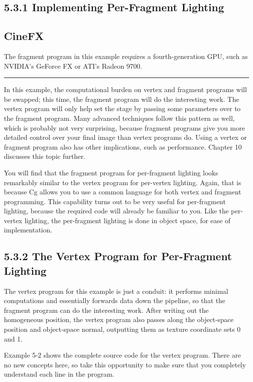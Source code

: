 \documentclass[../main.tex]{subfiles}
\begin{document}
\subsection{5.3.1 Implementing Per-Fragment Lighting}

\subsection*{CineFX}

The fragment program in this example requires a fourth-generation GPU, such as NVIDIA's GeForce FX or ATI's Radeon 9700.
\hrule

In this example, the computational burden on vertex and fragment programs will be swapped; this time, the fragment program will do the interesting work. The vertex program will only help set the stage by passing some parameters over to the fragment program. Many advanced techniques follow this pattern as well, which is probably not very surprising, because fragment programs give you more detailed control over your final image than vertex programs do. Using a vertex or fragment program also has other implications, such as performance. Chapter 10 discusses this topic further.

You will find that the fragment program for per-fragment lighting looks remarkably similar to the vertex program for per-vertex lighting. Again, that is because Cg allows you to use a common language for both vertex and fragment programming. This capability turns out to be very useful for per-fragment lighting, because the required code will already be familiar to you. Like the per-vertex lighting, the per-fragment lighting is done in object space, for ease of implementation.

\subsection{5.3.2 The Vertex Program for Per-Fragment Lighting}

The vertex program for this example is just a conduit: it performs minimal computations and essentially forwards data down the pipeline, so that the fragment program can do the interesting work. After writing out the homogeneous position, the vertex program also passes along the object-space position and object-space normal, outputting them as texture coordinate sets 0 and 1.

Example 5-2 shows the complete source code for the vertex program. There are no new concepts here, so take this opportunity to make sure that you completely understand each line in the program.
\end{document}
